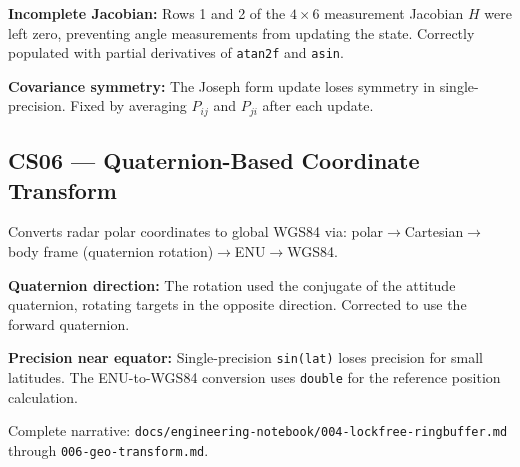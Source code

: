 \textbf{Incomplete Jacobian:} Rows 1 and 2 of the $4\times6$ measurement Jacobian $H$ were left zero, preventing angle measurements from updating the state. Correctly populated with partial derivatives of \texttt{atan2f} and \texttt{asin}.

\textbf{Covariance symmetry:} The Joseph form update loses symmetry in single-precision. Fixed by averaging $P_{ij}$ and $P_{ji}$ after each update.

\subsection{CS06 --- Quaternion-Based Coordinate Transform}

Converts radar polar coordinates to global WGS84 via: polar$\rightarrow$Cartesian$\rightarrow$body frame (quaternion rotation)$\rightarrow$ENU$\rightarrow$WGS84.

\textbf{Quaternion direction:} The rotation used the conjugate of the attitude quaternion, rotating targets in the opposite direction. Corrected to use the forward quaternion.

\textbf{Precision near equator:} Single-precision \texttt{sin(lat)} loses precision for small latitudes. The ENU-to-WGS84 conversion uses \texttt{double} for the reference position calculation.

Complete narrative: \texttt{docs/engineering-notebook/004-lockfree-ringbuffer.md} through \texttt{006-geo-transform.md}.